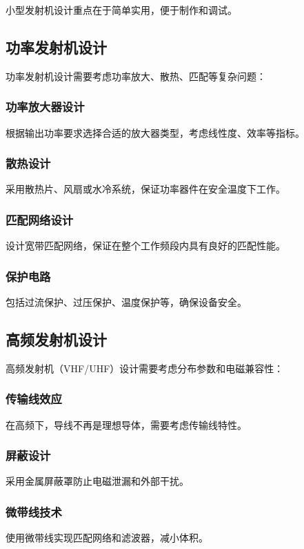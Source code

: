 \documentclass[12pt,UTF8]{ctexbook}
\begin{document}
小型发射机设计重点在于简单实用，便于制作和调试。

\subsection{功率发射机设计}

功率发射机设计需要考虑功率放大、散热、匹配等复杂问题：

\subsubsection{功率放大器设计}
根据输出功率要求选择合适的放大器类型，考虑线性度、效率等指标。

\subsubsection{散热设计}
采用散热片、风扇或水冷系统，保证功率器件在安全温度下工作。

\subsubsection{匹配网络设计}
设计宽带匹配网络，保证在整个工作频段内具有良好的匹配性能。

\subsubsection{保护电路}
包括过流保护、过压保护、温度保护等，确保设备安全。

\subsection{高频发射机设计}

高频发射机（VHF/UHF）设计需要考虑分布参数和电磁兼容性：

\subsubsection{传输线效应}
在高频下，导线不再是理想导体，需要考虑传输线特性。

\subsubsection{屏蔽设计}
采用金属屏蔽罩防止电磁泄漏和外部干扰。

\subsubsection{微带线技术}
使用微带线实现匹配网络和滤波器，减小体积。
\end{document}
